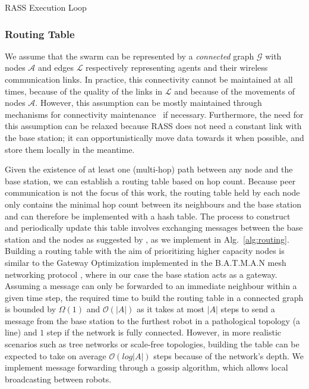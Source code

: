 \documentclass[letterpaper, 10 pt, conference]{ieeeconf}
\begin{document}
\begin{algorithm}[h]
\small
\SetAlgoLined
\DontPrintSemicolon
 \caption{RASS Execution Loop}
 \label{alg:rass}
\end{algorithm}



\subsubsection{Routing Table}
\label{section:routingTable}
We assume that the swarm can be represented by a
\textit{connected} graph
$\mathcal{G}$ with nodes $\mathcal{A}$ and edges $\mathcal{L}$
respectively representing agents and their wireless communication
links. In practice, this connectivity cannot be maintained at all times, because of the quality of the links in $\mathcal{L}$ and because of the movements of nodes $\mathcal{A}$. However, this assumption can be mostly maintained through mechanisms for connectivity maintenance~\cite{varadharajan2020swarm} if necessary. Furthermore, the need for this assumption can be relaxed because RASS does not need a constant link with the base station; it can opportunistically move data towards it when possible, and store them locally in the meantime.

Given the existence of at least one (multi-hop) path between any node and the base station, 
we can establish a routing table based on hop count. Because peer communication is not the 
focus of this work, the routing table held by each node only contains the minimal hop count 
between its neighbours and the base station and can therefore
be implemented with a hash table. The process to construct and periodically update this 
table involves exchanging messages between the base station and the nodes as suggested by 
\cite{abdullah2015detecting}, as we implement in Alg.~\ref{alg:routing}. Building a routing 
table with the aim of prioritizing higher capacity nodes is similar to the Gateway 
Optimization \cite{openMesh2021gateways} implemented in the B.A.T.M.A.N mesh networking 
protocol \cite{johnson2008simple}, where in our case the base station acts as a gateway.
Assuming a message can only be forwarded to an immediate neighbour within a given time 
step, the required time to build the routing table in a connected graph is bounded by 
$\Omega(1)$ and $\mathcal{O}(|A|)$ as it takes at most $|A|$ steps to send a message from 
the base station to the furthest robot in a pathological topology (a line) and $1$ step if 
the network is fully connected. However, in more realistic scenarios such as tree networks 
or scale-free topologies, building the table can be expected to take on average 
$\mathcal{O}(log|A|)$ steps because of the network's depth. We implement message forwarding through a gossip algorithm, which allows local broadcasting between robots.
\end{document}
